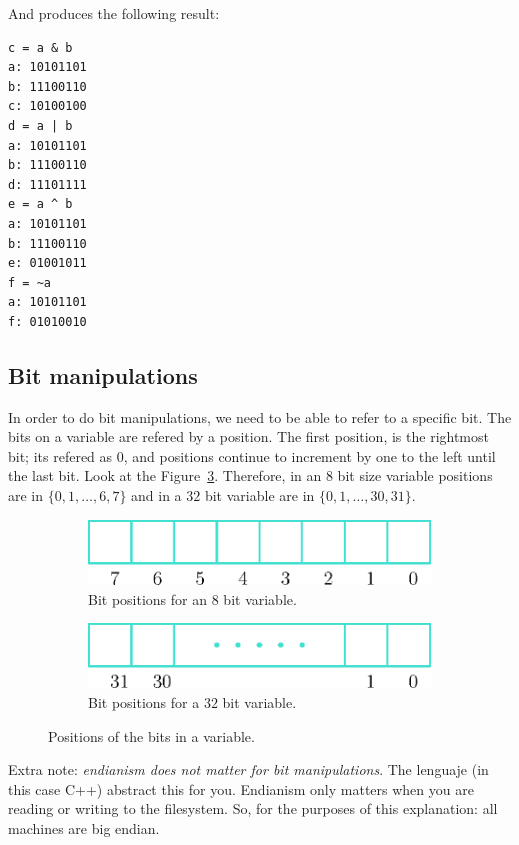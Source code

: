 And produces the following result:

\begin{verbatim}
c = a & b
a: 10101101
b: 11100110
c: 10100100
d = a | b
a: 10101101
b: 11100110
d: 11101111
e = a ^ b
a: 10101101
b: 11100110
e: 01001011
f = ~a
a: 10101101
f: 01010010
\end{verbatim}

\subsection{Bit manipulations}

In order to do bit manipulations, we need to be able to refer to a specific bit.
The bits on a variable are refered by a position.
The first position, is the rightmost bit; its refered as $0$, and positions continue to increment by one to the left until the last bit.
Look at the Figure~\ref{fig:bitPos}.
Therefore, in an $8$ bit size variable positions are in $\{ 0, 1, \ldots, 6, 7 \}$ and in a $32$ bit variable are in $\{ 0, 1, \ldots, 30, 31 \}$.

\begin{figure}[htb]
  \centering
  \begin{subfigure}[b]{0.35\textwidth}
    \includegraphics[width=\textwidth]{img/bitPositions}
    \caption{Bit positions for an $8$ bit variable.}
    \label{fig:bitPosa}
  \end{subfigure}
  \hspace*{1cm}
  \begin{subfigure}[b]{0.35\textwidth}
    \includegraphics[width=\textwidth]{img/bitPositions2}
    \caption{Bit positions for a $32$ bit variable.}
    \label{fig:bitPosb}
  \end{subfigure}
  \caption{Positions of the bits in a variable.}
  \label{fig:bitPos}
\end{figure}

Extra note: \emph{endianism does not matter for bit manipulations}.
The lenguaje (in this case C++) abstract this for you.
Endianism only matters when you are reading or writing to the filesystem.
So, for the purposes of this explanation: all machines are big endian.

